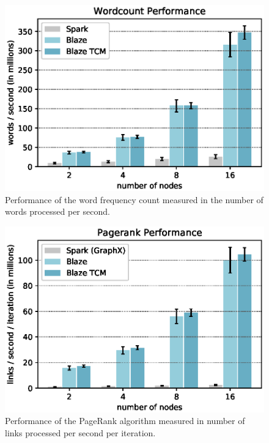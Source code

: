 \begin{figure}
  \begin{center}
  \includegraphics[width=0.7\linewidth]{figs/wordcount_speed.eps}
  \end{center}
  \vspace{-0.2cm}
  \caption{Performance of the word frequency count measured in the number of words processed per second.
  }
  \label{fig:wordcount_speed}
\end{figure}
\begin{figure}
  \begin{center}
  \includegraphics[width=0.7\linewidth]{figs/pagerank_speed.eps}
  \end{center}
  \vspace{-0.2cm}
  \caption{Performance of the PageRank algorithm measured in number of links processed per second per iteration.
  }
  \label{fig:pagerank_speed}
\end{figure}

